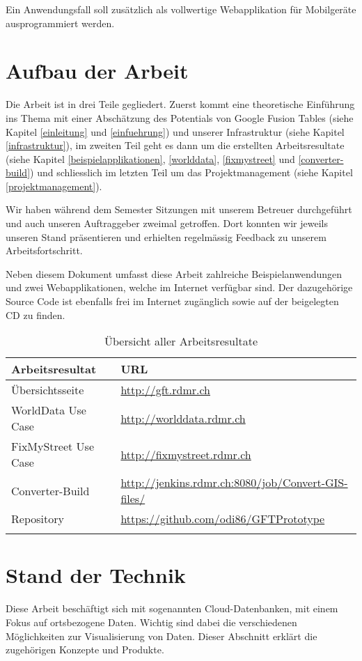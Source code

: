 Ein Anwendungsfall soll zusätzlich als vollwertige Webapplikation für Mobilgeräte ausprogrammiert werden.

\section{Aufbau der Arbeit}
Die Arbeit ist in drei Teile gegliedert. Zuerst kommt eine theoretische Einführung ins Thema mit einer Abschätzung des Potentials von Google Fusion Tables (siehe Kapitel \ref{einleitung} und \ref{einfuehrung}) und unserer Infrastruktur (siehe Kapitel \ref{infrastruktur}), im zweiten Teil geht es dann um die erstellten Arbeitsresultate (siehe Kapitel \ref{beispielapplikationen}, \ref{worlddata}, \ref{fixmystreet} und \ref{converter-build}) und schliesslich im letzten Teil um das Projektmanagement (siehe Kapitel \ref{projektmanagement}).

Wir haben während dem Semester Sitzungen mit unserem Betreuer durchgeführt und auch unseren Auftraggeber zweimal getroffen. Dort konnten wir jeweils unseren Stand präsentieren und erhielten regelmässig Feedback zu unserem Arbeitsfortschritt.

Neben diesem Dokument umfasst diese Arbeit zahlreiche Beispielanwendungen und zwei Webapplikationen, welche im Internet verfügbar sind. Der dazugehörige Source Code ist ebenfalls frei im Internet zugänglich sowie auf der beigelegten CD zu finden.

\begin{longtable}{|l|l|}
\hline 
\textbf{Arbeitsresultat} & \textbf{URL} \\ 
\hline 
Übersichtsseite & \url{http://gft.rdmr.ch} \\ 
\hline 
WorldData Use Case & \url{http://worlddata.rdmr.ch} \\ 
\hline 
FixMyStreet Use Case & \url{http://fixmystreet.rdmr.ch} \\ 
\hline 
Converter-Build & \url{http://jenkins.rdmr.ch:8080/job/Convert-GIS-files/} \\ 
\hline 
Repository & \url{https://github.com/odi86/GFTPrototype} \\ 
\hline 
\caption{Übersicht aller Arbeitsresultate}
\label{arbeitsresultate}
\end{longtable} 

\section{Stand der Technik}
Diese Arbeit beschäftigt sich mit sogenannten \gls{Cloud}-Datenbanken, mit einem Fokus auf ortsbezogene Daten. Wichtig sind dabei die verschiedenen Möglichkeiten zur Visualisierung von Daten. Dieser Abschnitt erklärt die zugehörigen Konzepte und Produkte.

